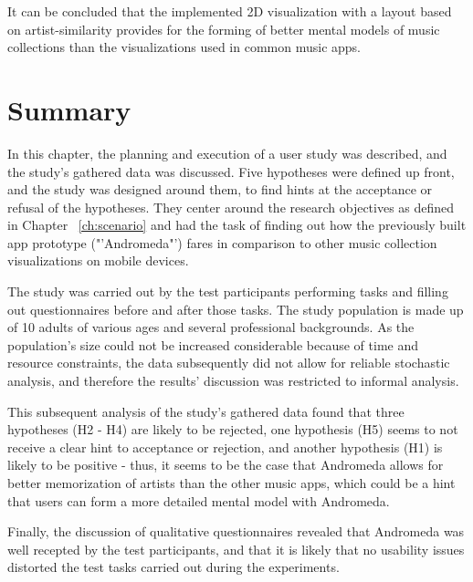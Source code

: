 It can be concluded that the implemented 2D visualization with a layout based on artist-similarity provides for the forming of better mental models of music collections than the visualizations used in common music apps.

\section{Summary}

In this chapter, the planning and execution of a user study was described, and the study's gathered data was discussed. Five hypotheses were defined up front, and the study was designed around them, to find hints at the acceptance or refusal of the hypotheses. They center around the research objectives as defined in Chapter ~\ref{ch:scenario} and had the task of finding out how the previously built app prototype ("'Andromeda"') fares in comparison to other music collection visualizations on mobile devices. 

The study was carried out by the test participants performing tasks and filling out questionnaires before and after those tasks. The study population is made up of 10 adults of various ages and several professional backgrounds. As the population's size could not be increased considerable because of time and resource constraints, the data subsequently did not allow for reliable stochastic analysis, and therefore the results' discussion was restricted to informal analysis.

This subsequent analysis of the study's gathered data found that three hypotheses (H2 - H4) are likely to be rejected, one hypothesis (H5) seems to not receive a clear hint to acceptance or rejection, and another hypothesis (H1) is likely to be positive - thus, it seems to be the case that Andromeda allows for better memorization of artists than the other music apps, which could be a hint that users can form a more detailed mental model with Andromeda.

Finally, the discussion of qualitative questionnaires revealed that Andromeda was well recepted by the test participants, and that it is likely that no usability issues distorted the test tasks carried out during the experiments.